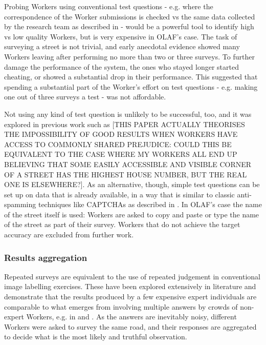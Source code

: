         Probing Workers using conventional test questions - e.g. where the correspondence of the Worker submissions is checked vs the same data collected by the research team as described in \cite{Kittur:2008gj} - would be a powerful tool to identify high vs low quality Workers, but is very expensive in OLAF's case. The task of surveying a street is not trivial, and early anecdotal evidence showed many Workers leaving after performing no more than two or three surveys. To further damage the performance of the system, the ones who stayed longer started cheating, or showed a substantial drop in their performance. This suggested that spending a substantial part of the Worker's effort on test questions - e.g. making one out of three surveys a test - was not affordable.
        
        Not using any kind of test question is unlikely to be successful, too, and it was explored in previous work such as \cite{DellaPenna:tf} [THIS PAPER ACTUALLY THEORISES THE IMPOSSIBILITY OF GOOD RESULTS WHEN WORKERS HAVE ACCESS TO COMMONLY SHARED PREJUDICE: COULD THIS BE EQUIVALENT TO THE CASE WHERE MY WORKERS ALL END UP BELIEVING THAT SOME EASILY ACCESSIBLE AND VISIBLE CORNER OF A STREET HAS THE HIGHEST HOUSE NUMBER, BUT THE REAL ONE IS ELSEWHERE?]. As an alternative, though, simple test questions can be set up on data that is already available, in a way that is similar to classic anti-spamming techniques like CAPTCHAs as described in \cite{Difallah:2012ty}. In OLAF's case the name of the street itself is used: Workers are asked to copy and paste or type the name of the street as part of their survey. Workers that do not achieve the target accuracy are excluded from further work.

    \subsubsection{Results aggregation}

        Repeated surveys are equivalent to the use of repeated judgement in conventional image labelling exercises. These have been explored extensively in literature and demonstrate that the results produced by a few expensive expert individuals are comparable to what emerges from involving multiple answers by crowds of non-expert Workers, e.g. in \cite{Snow:2008wo} and \cite{Sheng:2008gra}. As the answers are inevitably noisy, different Workers were asked to survey the same road, and their responses are aggregated to decide what is the most likely and truthful observation. 
        

